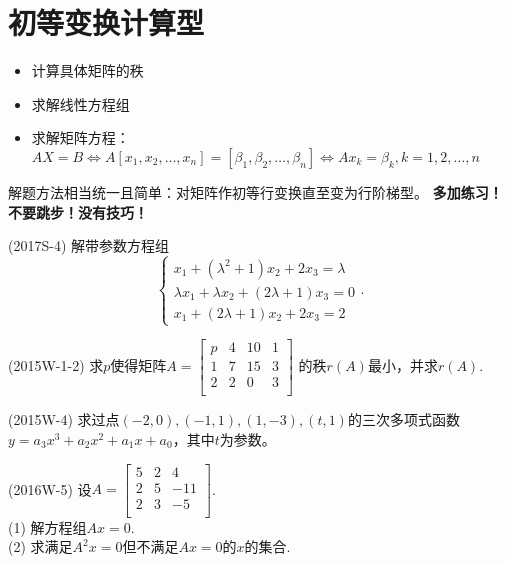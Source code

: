 \documentclass[lang=cn,newtx,10pt,scheme=chinese]{elegantbook}
\begin{document}
\section{初等变换计算型}

\begin{itemize}
    \item 计算具体矩阵的秩
    \item 求解线性方程组
    \item 求解矩阵方程：$AX=B \iff A[x_1,x_2,\dots,x_n] = [\beta_1,\beta_2,\dots,\beta_n] \iff Ax_k = \beta_k,k=1,2,\dots,n$
\end{itemize}
解题方法相当统一且简单：对矩阵作初等行变换直至变为行阶梯型。
\textbf{多加练习！不要跳步！没有技巧！}

\begin{example}
    (2017S-4) 解带参数方程组
    $$
    \begin{cases}
        x_1 + (\lambda^2 + 1) x_2 + 2 x_3 = \lambda \\
        \lambda x_1 + \lambda x_2 + (2 \lambda + 1) x_3 = 0 \\
        x_1 + (2 \lambda + 1) x_2 + 2 x_3 = 2
    \end{cases}
    .
    $$
\end{example}

\begin{exercise}
    (2015W-1-2) 求$p$使得矩阵$
    A=
    \left[
    \begin{matrix}
        p & 4 & 10 & 1 \\
        1 & 7 & 15 & 3 \\
        2 & 2 & 0 & 3 \\
    \end{matrix}
    \right]
    $
    的秩$r(A)$最小，并求$r(A)$.
\end{exercise}

\begin{exercise}
    (2015W-4) 求过点$(-2,0),(-1,1),(1,-3),(t,1)$的三次多项式函数$y = a_3 x^3 + a_2 x^2 + a_1 x + a_0$，其中$t$为参数。
\end{exercise}

\begin{exercise}
    (2016W-5) 设$A = 
    \left[
    \begin{matrix}
        5 & 2 & 4 \\
        2 & 5 & -11 \\
        2 & 3 & -5 \\
    \end{matrix}
    \right]
    $. \\
    (1) 解方程组$A x = 0$. \\
    (2) 求满足$A^2 x = 0$但不满足$A x = 0$的$x$的集合. \\
\end{exercise}
\end{document}
